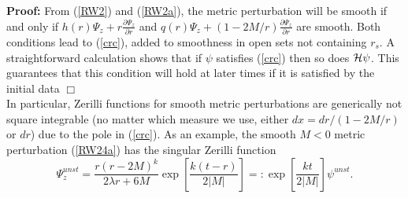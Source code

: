 \documentclass[aps,floats,showpacs,amssymb,tightenlines]{revtex4}
\begin{document}
\noindent
{\bf Proof:} From (\ref{RW2}) and (\ref{RW2a}), the metric perturbation will be smooth
if and only if $h(r) \Psi_z
+r\frac{\partial \Psi_z}{ \partial r} $ and $q(r) \Psi_z+ (1-2M/r)\frac{\partial \Psi_z}{\partial r}$
are smooth. Both conditions lead to (\ref{crc}), added to smoothness in open sets not containing $r_s$.
A straightforward calculation shows that if $\psi$ satisfies (\ref{crc}) then so does ${\cal H} \psi$.
This guarantees that this condition will hold
at later times if it is satisfied by the initial data $\Box$\\

In particular, Zerilli functions for smooth metric perturbations are generically not square integrable  (no matter
which measure we use, either $dx=dr/(1-2M/r)$ or $dr$) due to the
pole in (\ref{crc}). As an example, the smooth $M<0$ metric perturbation (\ref{RW24a}) has the singular Zerilli function
\begin{equation}
\label{ines}
 \Psi_z^{unst}  = \frac{r \left( r - 2 M \right) ^{k}}{2 \lambda r +6M} \exp \left[\frac{k(t- r)}{2|M|}\right] =:
 \exp \left[\frac{kt}{2|M|}\right] \psi^{unst}.
\end{equation}
\end{document}
